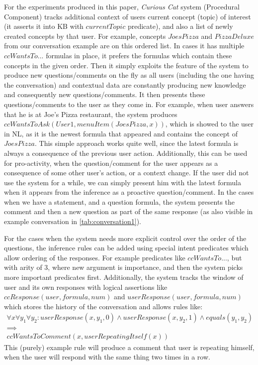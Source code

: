For the experiments produced in this paper, \emph{Curious Cat} system 
(Procedural Component) tracks additional context of users current concept 
(topic) of interest (it asserts it into KB with $currentTopic$ predicate), and 
also a list of newly created concepts by that user. For example, concepts 
$JoesPizza$ and $PizzaDeluxe$ from our conversation example are on this ordered
list. In cases it has multiple $ccWantsTo...$ formulas in place, it prefers 
the formulas which contain these concepts in the given order. Then it simply 
exploits the feature of the system to produce new questions/comments on the fly
as all users (including the one having the conversation) and contextual data 
are constantly producing new knowledge and consequently new questions/comments.
It then presents these questions/comments to the user as they come in. For 
example, when user answers that he is at Joe's Pizza restaurant, the system 
produces $ccWantsToAsk(User1, menuItem(JoesPizza,x))$, which is showed to the 
user in NL, as it is the newest formula that appeared and contains the concept 
of $JoesPizza$. This simple approach works quite well, since the latest formula 
is always a consequence of the previous user action. Additionally, this can be 
used for pro-activity, when the question/comment for the user appears as a 
consequence of some other user's action, or a context change. If the user did not
use the system for a while, we can simply present him with the latest formula 
when it appears from the inference as a proactive question/comment. In the cases
when we have a statement, and a question formula, the system presents the 
comment and then a new question as part of the same response (as also visible
in example conversation in \autoref{tab:conversation1}).

For the cases when the system needs more explicit control over the order of 
the questions, the inference rules can be added using special intent predicates
which allow ordering of the responses. For example predicates like 
$ccWantsTo...$, but with arity of 3, where new argument is importance, and then
the system picks more important predicates first. Additionally, the system 
tracks the window of user and its own responses with logical assertions like 
$ccResponse(user,formula,num)$ and $userResponse(user,formula,num)$ which 
stores the history of the conversation and allows rules like:
\begin{equation*}
\begin{gathered}
	\forall x \forall y_1 \forall y_2: userResponse(x,y_1,0) \land userResponse(x,y_2,1) \land equals(y_1,y_2) \\
	\implies \\
	ccWantsToComment(x,userRepeatingItself(x))
\end{gathered}
\end{equation*}
This (purely) example rule will produce a comment that user is repeating 
himself, when the user will respond with the same thing two times in a row.

